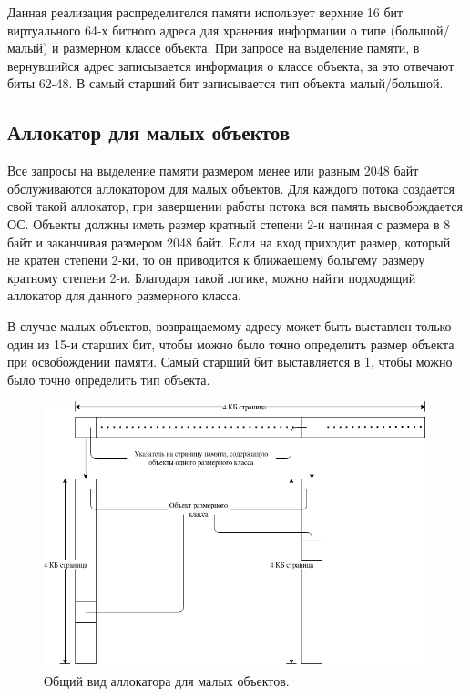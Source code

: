 Данная реализация распределителся памяти использует верхние 16 бит виртуального 64-х битного адреса для хранения информации о типе (большой/малый) и размерном классе объекта. При запросе на выделение памяти, в вернувшийся адрес записывается информация о классе объекта, за это отвечают биты 62-48. В самый старший бит записывается тип объекта малый/большой.\cite{page-tables}

\subsection{Аллокатор для малых объектов}
Все запросы на выделение памяти размером менее или равным 2048 байт обслуживаются аллокатором для малых объектов. Для каждого потока создается свой такой аллокатор, при завершении работы потока вся память высвобождается ОС. Объекты должны иметь размер кратный степени 2-и начиная с размера в 8 байт и заканчивая размером 2048 байт. Если на вход приходит размер, который не кратен степени 2-ки, то он приводится к ближаешему больгему размеру кратному степени 2-и. Благодаря такой логике, можно найти подходящий аллокатор для данного размерного класса.

В случае малых объектов, возвращаемому адресу может быть выставлен только один из 15-и старших бит, чтобы можно было точно определить размер объекта при освобождении памяти. Самый старший бит выставляется в 1, чтобы можно было точно определить тип объекта.

\begin{figure}[!h]
	\begin{center}
		\includegraphics[scale=0.6]{images/small-allocator-design.png}
		\caption{Общий вид аллокатора для малых объектов.}
		\label{small-allocator-design}
	\end{center}
\end{figure}

